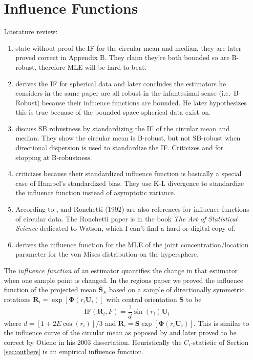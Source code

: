 \documentclass{article}\usepackage{graphicx, color}
\newcommand{\ProjMean}{{\widehat{\bm S}_{E}}}
\begin{document}
\section{Influence Functions}\label{sec:ifs}

Literature review:
\begin{enumerate}
\item \cite{wehrly1981} state without proof the IF for the circular mean and median, they are later proved correct in \cite{otieno2002} Appendix B.  They claim they're both bounded so are B-robust, therefore MLE will be hard to beat.

\item \cite{watson1986} derives the IF for spherical data and later concludes the estimators he considers in the same paper are all robust in the infantesimal sense (i.e.~B-Robust) because their influence functions are bounded.  He later hypothesizes this is true becuase of the bounded space spherical data exist on.

\item \cite{ko1988} discuss SB robustness by standardizing the IF of the circular mean and median.  They show the circular mean is B-robust, but not SB-robust when directional dispersion is used to standardize the IF.  Criticizes \cite{wehrly1981} and \cite{watson1986} for stopping at B-robustness.

\item \cite{he1992} criticizes \cite{ko1988} because their standardized influence function is basically a special case of Hampel's standardized bias.  They use K-L divergence to standardize the influence function instead of asymptotic variance.

\item According to \cite{agostinelli2007}, \cite{ko1992} and Ronchetti (1992) are also references for influence functions of circular data.  The Ronchetti paper is in the book {\it The Art of Statistical Science} dedicated to Watson, which I can't find a hard or digital copy of.

\item \cite{kato2012} derives the influence function for the MLE of the joint concentration/location parameter for the von Mises distribution on the hypersphere.
\end{enumerate}

The \emph{influence function} of an estimator quantifies the change in that estimator when one sample point is changed.  In the regions paper we proved the influence function of the projected mean $\ProjMean$ based on a sample of directionally symmetric rotations $\bm R_i=\exp[\bm \Phi(r_i\bm U_i)]$ with central orientation $\bm S$ to be
\begin{equation}\label{eqn:IF}
\text{IF}(\bm R_i,F)=\frac{1}{d}\sin(r_i)\bm U_i
\end{equation}
where $d=[1+2E\cos(r_i)]/3$ and $\bm R_i=\bm S\exp[\bm\Phi(r_i\bm U_i)]$.  This is similar to the influence curve of the circular mean as poposed by \cite{wehrly1981} and later proved to be correct by Otieno in his 2003 dissertation.  Heuristically the $C_i$-statistic of Section \ref{sec:outliers} is an empirical influence function.  
\end{document}
